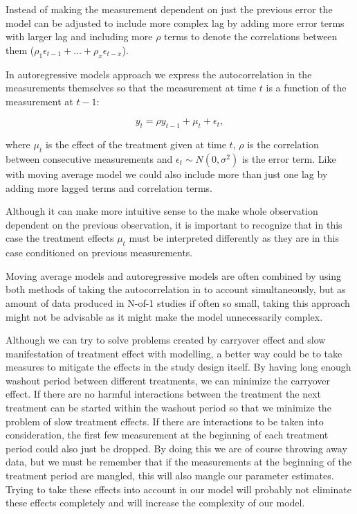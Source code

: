 \documentclass[12pt,a4paper,leqno]{report}
\theoremstyle{plain}
\theoremstyle{definition}
\theoremstyle{remark}
\begin{document}
Instead of making the measurement dependent on just the previous error the model can be
adjusted to include more complex lag by adding more error terms with larger lag and
including more \(\rho \) terms to denote the correlations between them
(\(\rho_1\epsilon_{t-1} + \ldots + \rho_x\epsilon_{t-x}\)).

In autoregressive models approach we express the autocorrelation in the measurements
themselves so that the measurement at time \(t\) is a function of the measurement at
\(t-1\):

\begin{def}\label{}
    \begin{equation}\label{}
        y_t = \rho y_{t-1} + \mu_t + \epsilon_t,
    \end{equation}
\end{def}where \(\mu_t\) is the effect of the treatment given at time \(t\), \(\rho \) is
the correlation between consecutive measurements and \(\epsilon_t \sim N(0,\sigma^2)\) is
the error term. Like with moving average model we could also include more than just one
lag by adding more lagged terms and correlation terms.

Although it can make more intuitive sense to the make whole observation dependent on the
previous observation, it is important to recognize that in this case the treatment
effects \(\mu_t\) must be interpreted differently as they are in this case conditioned on
previous measurements.

Moving average models and autoregressive models are often combined by using both methods
of taking the autocorrelation in to account simultaneously, but as amount of data
produced in N-of-1 studies if often so small, taking this approach might not be advisable
as it might make the model unnecessarily complex.

Although we can try to solve problems created by carryover effect and slow manifestation
of treatment effect with modelling, a better way could be to take measures to mitigate
the effects in the study design itself. By having long enough washout period between
different treatments, we can minimize the carryover effect. If there are no harmful
interactions between the treatment the next treatment can be started within the washout
period so that we minimize the problem of slow treatment effects. If there are
interactions to be taken into consideration, the first few measurement at the beginning
of each treatment period could also just be dropped. By doing this we are of course
throwing away data, but we must be remember that if the measurements at the beginning of
the treatment period are mangled, this will also mangle our parameter estimates. Trying
to take these effects into account in our model will probably not eliminate these effects
completely and will increase the complexity of our model.
\end{document}
